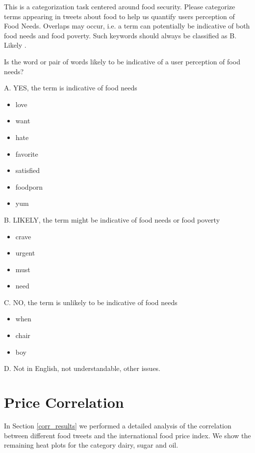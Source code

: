 This is a categorization task centered around food security. Please categorize terms appearing in tweets about food to help us quantify users perception of Food Needs. Overlaps may occur, i.e. a term can potentially be indicative of both food needs and food poverty. Such keywords should always be classified as B. Likely .

Is the word or pair of words likely to be indicative of a user perception of food needs?

A. YES, the term is indicative of food needs

\begin{itemize}
  \item love
  \item want
  \item hate
  \item favorite 
  \item satisfied
  \item foodporn
  \item yum


\end{itemize}

B. LIKELY, the term might be indicative of food needs or food poverty
\begin{itemize}
  \item crave
  \item urgent
  \item must
  \item need
\end{itemize}

C. NO, the term is unlikely to be indicative of food needs 
\begin{itemize}
  \item when
  \item chair
  \item boy
\end{itemize}

D. Not in English, not understandable, other issues.

\chapter{Price Correlation}
\label{pCorr}

In Section \ref{corr_results} we performed a detailed analysis of the correlation between different food tweets and the international food price index. We show the remaining heat plots for the category dairy, sugar and oil. 


